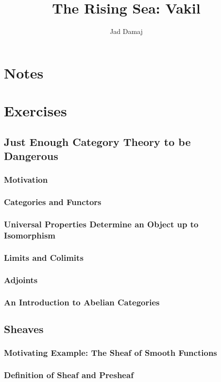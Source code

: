 \documentclass[openany]{book}
\title{The Rising Sea: Vakil}
\author{Jad Damaj}
\date{}
\begin{document}
\maketitle

\tableofcontents

\newpage

\part{Notes}


\part{Exercises}



\chapter{Just Enough Category Theory to be Dangerous}

\section{Motivation}

\section{Categories and Functors}



\section{Universal Properties Determine an Object up to Isomorphism}



\section{Limits and Colimits}

\section{Adjoints}

\section{An Introduction to Abelian Categories}



\chapter{Sheaves}

\section{Motivating Example: The Sheaf of Smooth Functions}



\section{Definition of Sheaf and Presheaf}


\end{document}
